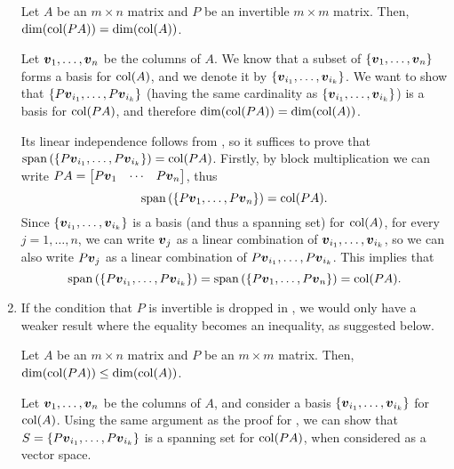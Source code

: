 \begin{enumerate}
\begin{theorem}
\label{thm:mult-inv-matx-preserv-dim}
Let \(A\) be an \(m\times n\) matrix and \(P\) be an invertible \(m\times m\)
matrix. Then, \(\dim(\operatorname{col}(PA))=\dim(\operatorname{col}(A))\).
\end{theorem}
\begin{pf}
Let \(\vb*{v}_1,\dotsc,\vb*{v}_n\) be the columns of \(A\). We know that a
subset of \(\{\vb*{v}_1,\dotsc,\vb*{v}_n\}\) forms a basis for \(\operatorname{col}(A)\),
and we denote it by \(\{\vb*{v}_{i_1},\dotsc,\vb*{v}_{i_k}\}\). We want to
show that \(\{P\vb*{v}_{i_1},\dotsc,P\vb*{v}_{i_k}\}\) (having the same
cardinality as \(\{\vb*{v}_{i_1},\dotsc,\vb*{v}_{i_k}\}\)) is a basis for
\(\operatorname{col}(PA)\), and therefore \(\dim(\operatorname{col}(PA))=\dim(\operatorname{col}(A))\).

Its linear independence follows from , so it
suffices to prove that \(\operatorname{span}\qty(\{P\vb*{v}_{i_1},\dotsc,P\vb*{v}_{i_k}\})=\operatorname{col}(PA)\).
Firstly, by block multiplication we can write
\(PA=\mqty[P\vect{v}_1&\cdots&P\vect{v}_n]\), thus
\[
\operatorname{span}\qty(\{P\vb*{v}_1,\dotsc,P\vb*{v}_n\})=\operatorname{col}(PA).
\]
Since \(\{\vb*{v}_{i_1},\dotsc,\vb*{v}_{i_k}\}\) is a basis (and thus a
spanning set) for \(\operatorname{col}(A)\), for every \(j=1,\dotsc,n\), we can write
\(\vb*{v}_j\) as a linear combination of
\(\vb*{v}_{i_1},\dotsc,\vb*{v}_{i_k}\), so we can also write \(P\vb*{v}_j\)
as a linear combination of \(P\vb*{v}_{i_1},\dotsc,P\vb*{v}_{i_k}\). This
implies that
\[
\operatorname{span}\qty(\{P\vb*{v}_{i_1},\dotsc,P\vb*{v}_{i_k}\})
=\operatorname{span}\qty(\{P\vb*{v}_1,\dotsc,P\vb*{v}_n\})=\operatorname{col}(PA).
\]
\end{pf}

\item If the condition that \(P\) is invertible is dropped in
, we would only have a weaker result where
the equality becomes an inequality, as suggested below.

\begin{proposition}
\label{prp:mult-matx-reduce-col-sp-dim}
Let \(A\) be an \(m\times n\) matrix and \(P\) be an \(m\times m\) matrix. Then,
\(\dim(\operatorname{col}(PA))\le\dim(\operatorname{col}(A))\).
\end{proposition}
\begin{pf}
Let \(\vb*{v}_1,\dotsc,\vb*{v}_n\) be the columns of \(A\), and consider a
basis \(\{\vb*{v}_{i_1},\dotsc,\vb*{v}_{i_k}\}\) for \(\operatorname{col}(A)\). Using the
same argument as the proof for , we can
show that \(S=\{P\vb*{v}_{i_1},\dotsc,P\vb*{v}_{i_k}\}\) is a spanning set for
\(\operatorname{col}(PA)\), when considered as a vector space.


\end{pf}
\end{enumerate}
